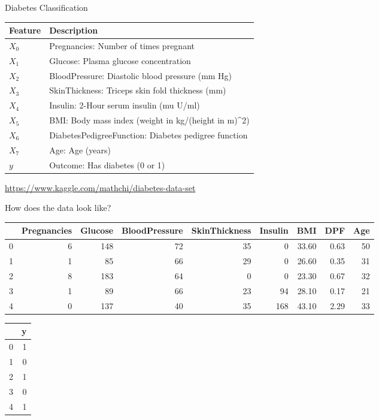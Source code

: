 \documentclass[obeyspaces,aspectratio=43]{beamer}
\begin{document}
\begin{frame}{Diabetes Classification}

\tiny

\begin{longtable}[c]{@{}ll@{}}
\toprule
Feature & Description\tabularnewline
\midrule
\endhead
\(X_0\) & Pregnancies: Number of times pregnant\tabularnewline
\(X_1\) & Glucose: Plasma glucose concentration\tabularnewline
\(X_2\) & BloodPressure: Diastolic blood pressure (mm Hg)\tabularnewline
\(X_3\) & SkinThickness: Triceps skin fold thickness (mm)\tabularnewline
\(X_4\) & Insulin: 2-Hour serum insulin (mu U/ml)\tabularnewline
\(X_5\) & BMI: Body mass index (weight in kg/(height in
m)\^{}2)\tabularnewline
\(X_6\) & DiabetesPedigreeFunction: Diabetes pedigree
function\tabularnewline
\(X_7\) & Age: Age (years)\tabularnewline
\(y\) & Outcome: Has diabetes (0 or 1)\tabularnewline
\bottomrule
\end{longtable}

\url{https://www.kaggle.com/mathchi/diabetes-data-set}

\end{frame}

\begin{frame}{How does the data look like?}

\center
\tiny

\begin{tabular}{lrrrrrrrr}
\toprule
{} &  Pregnancies &  Glucose &  BloodPressure &  SkinThickness &  Insulin &   BMI &  DPF &  Age \\
\midrule
0 &            6 &      148 &             72 &             35 &        0 & 33.60 &                      0.63 &   50 \\
1 &            1 &       85 &             66 &             29 &        0 & 26.60 &                      0.35 &   31 \\
2 &            8 &      183 &             64 &              0 &        0 & 23.30 &                      0.67 &   32 \\
3 &            1 &       89 &             66 &             23 &       94 & 28.10 &                      0.17 &   21 \\
4 &            0 &      137 &             40 &             35 &      168 & 43.10 &                      2.29 &   33 \\
\bottomrule
\end{tabular}

\begin{tabular}{lr}
\toprule
{} &  y \\
\midrule
0 &        1 \\
1 &        0 \\
2 &        1 \\
3 &        0 \\
4 &        1 \\
\bottomrule
\end{tabular}

\end{frame}
\end{document}
